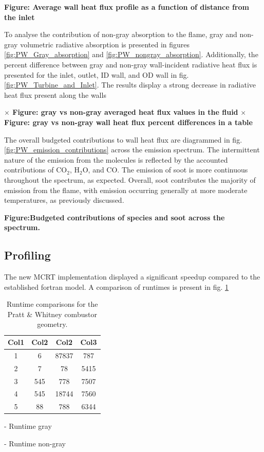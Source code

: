 \textbf{\checkmark Figure: Average wall heat flux profile as a function of distance from the inlet}

To analyse the contribution of non-gray absorption to the flame, gray and non-gray volumetric radiative absorption is presented in figures \ref{fig:PW_Gray_absorption} and \ref{fig:PW_nongray_absorption}.
Additionally, the percent difference between gray and non-gray wall-incident radiative heat flux is presented for the inlet, outlet, ID wall, and OD wall in fig. \ref{fig:PW_Turbine_and_Inlet}.
The results display a strong decrease in radiative heat flux present along the walls

\textbf{$\times$ Figure: gray vs non-gray averaged heat flux values in the fluid}
\textbf{$\times$ Figure: gray vs non-gray wall heat flux percent differences in a table}

The overall budgeted contributions to wall heat flux are diagrammed in fig. \ref{fig:PW_emission_contributions} across the emission spectrum.
The intermittent nature of the emission from the molecules is reflected by the accounted contributions of CO$_2$, H$_2$O, and CO. The emission of soot is more continuous throughout the spectrum, as expected.
Overall, soot contributes the majority of emission from the flame, with emission occurring generally at more moderate temperatures, as previously discussed.

\textbf{\checkmark Figure:Budgeted contributions of species and soot across the spectrum.}

\subsection{Profiling}
The new MCRT implementation displayed a significant speedup compared to the established fortran model. A comparison of runtimes is present in fig. \ref{table:PW_runtime_table}

\begin{table}[h!]
\centering
\begin{tabular}{||c c c c||} 
 \hline
 Col1 & Col2 & Col2 & Col3 \\ [0.5ex] 
 \hline\hline
 1 & 6 & 87837 & 787 \\ 
 2 & 7 & 78 & 5415 \\
 3 & 545 & 778 & 7507 \\
 4 & 545 & 18744 & 7560 \\
 5 & 88 & 788 & 6344 \\ [1ex] 
 \hline
\end{tabular}
\caption{Runtime comparisons for the Pratt \& Whitney combustor geometry.}
\label{table:PW_runtime_table}
\end{table}


- Runtime gray

- Runtime non-gray


